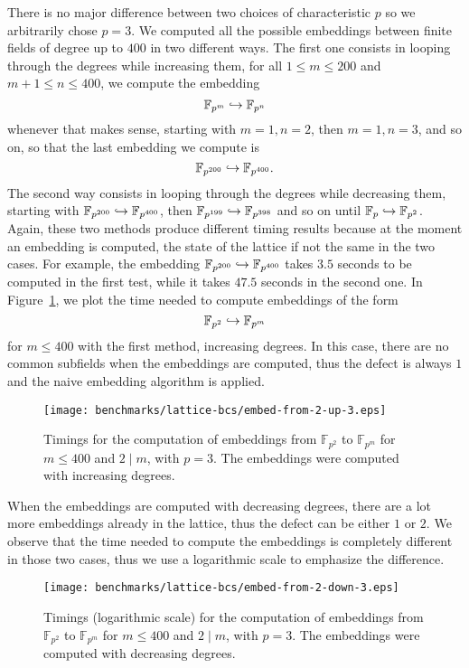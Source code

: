 There is no major difference between two choices of characteristic $p$ so we
arbitrarily chose $p=3$. We
computed all the possible embeddings between finite fields of degree up to $400$
in two different ways. The first one consists in looping through the degrees
while increasing them, \ie for all $1\leq m\leq200$ and $m+1 \leq n\leq 400$, we
compute the embedding 
\[
  \mathbb{F}_{p^{m}}\hookrightarrow \mathbb{F}_{p^{n}}
\]
whenever that makes sense, starting with $m=1, n=2$, then $m=1, n=3$, and so on, so
that the last embedding we compute is 
\[
  \mathbb{F}_{p^{200}}\hookrightarrow\mathbb{F}_{p^{400}}.
\]
The second way consists in looping through the
degrees while decreasing them, \ie starting with
$\mathbb{F}_{p^{200}}\hookrightarrow\mathbb{F}_{p^{400}}$, then
$\mathbb{F}_{p^{199}}\hookrightarrow\mathbb{F}_{p^{398}}$ and so on until
$\mathbb{F}_{p}\hookrightarrow\mathbb{F}_{p^{2}}$. Again, these two methods produce
different timing results because at the moment an embedding is computed, the
state of the lattice if not the same in the two cases. For example, the
embedding $\mathbb{F}_{p^{200}}\hookrightarrow\mathbb{F}_{p^{400}}$ takes $3.5$ seconds to
be computed in the first test, while it takes $47.5$ seconds in the second one.
In Figure~\ref{fig:bcs-embed-from-2-up}, we plot the time needed to compute
embeddings of the form
\[
  \mathbb{F}_{p^{2}}\hookrightarrow \mathbb{F}_{p^{m}}
\]
for $m\leq 400$ with the first method, \ie increasing degrees. In this case,
there are no common subfields when the embeddings are computed, thus the defect
is always $1$ and the naive embedding algorithm is applied.
\begin{figure}
  \centering
  \texttt{[image: benchmarks/lattice-bcs/embed-from-2-up-3.eps]}
  \caption{Timings for the computation of embeddings from $\mathbb{F}_{p^{2}}$
  to $\mathbb{F}_{p^{m}}$ for $m\leq 400$ and $2\mid m$, with $p=3$. The
  embeddings were computed with increasing degrees.}
  \label{fig:bcs-embed-from-2-up}
\end{figure}
When the embeddings are computed with decreasing degrees, there are a lot more
embeddings already in the lattice, thus the defect can be either $1$ or $2$. We
observe that the time needed to compute the embeddings is completely different
in those two cases, thus we use a logarithmic scale to emphasize the difference.
\begin{figure}
  \centering
  \texttt{[image: benchmarks/lattice-bcs/embed-from-2-down-3.eps]}
  \caption{Timings (logarithmic scale) for the computation of embeddings from
    $\mathbb{F}_{p^{2}}$ to $\mathbb{F}_{p^{m}}$ for $m\leq 400$ and $2\mid m$,
  with $p=3$. The embeddings were computed with decreasing degrees.}
  \label{fig:bcs-embed-from-2-down}
\end{figure}
